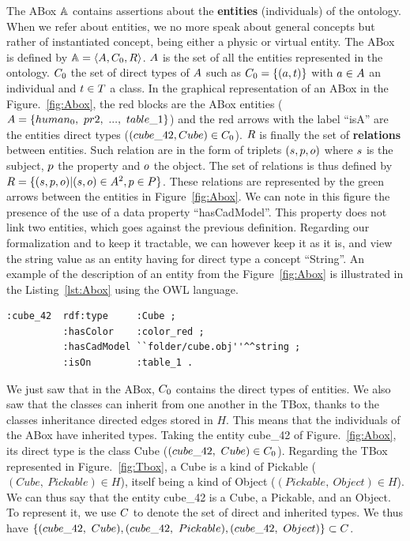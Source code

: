 The ABox $\mathbb{A}$ contains assertions about the \textbf{entities} (individuals) of the ontology. When we refer about entities, we no more speak about general concepts but rather of instantiated concept, being either a physic or virtual entity. The ABox is defined by $\mathbb{A} = \langle A, C_0, R \rangle$. $A$ is the set of all the entities represented in the ontology. $C_0$ the set of direct types of $A$ such as $C_0 = \{(a, t) \}$ with $a \in A$ an individual and $t \in T$ a class. In the graphical representation of an ABox in the Figure.~\ref{fig:Abox}, the red blocks are the ABox entities ($\indivset = \{human_0,\ pr2,\ ...,\ table\_1\}$) and the red arrows with the label ``isA'' are the entities direct types ($(cube\_42, Cube) \in C_0$).
$R$ is finally the set of \textbf{relations} between entities. Such relation are in the form of triplets $(s, p ,o)$ where $s$ is the subject, $p$ the property and $o$ the object. The set of relations is thus defined by $R = \{(s, p ,o) | (s, o) \in A^2, p \in P\}$. These relations are represented by the green arrows between the entities in Figure~\ref{fig:Abox}. We can note in this figure the presence of the use of a data property ``hasCadModel''. This property does not link two entities, which goes against the previous definition. Regarding our formalization and to keep it tractable, we can however keep it as it is, and view the string value as an entity having for direct type a concept ``String''. An example of the description of an entity from the Figure~\ref{fig:Abox} is illustrated in the Listing~\ref{lst:Abox} using the OWL language.

\begin{lstlisting}[frame=single, basicstyle=\scriptsize\ttfamily, label={lst:Abox}, caption={Description of an ontology individual in the OWL language using the Turle syntax.},captionpos=b, style=OwlTurtle_indiv]
:cube_42  rdf:type     :Cube ;
          :hasColor    :color_red ;
          :hasCadModel ``folder/cube.obj''^^string ;
          :isOn        :table_1 .
\end{lstlisting}

We just saw that in the ABox, $C_0$ contains the direct types of entities. We also saw that the classes can inherit from one another in the TBox, thanks to the classes inheritance directed edges stored in $H$. This means that the individuals of the ABox have inherited types. Taking the entity cube\_42 of Figure.~\ref{fig:Abox}, its direct type is the class Cube ($(cube\_42,\ Cube) \in \inheritset_0$). Regarding the TBox represented in Figure.~\ref{fig:Tbox}, a Cube is a kind of Pickable ($(Cube,\ Pickable) \in H$), itself being a kind of Object ($(Pickable,\ Object) \in H$). We can thus say that the entity cube\_42 is a Cube, a Pickable, and an Object. To represent it, we use $C$ to denote the set of direct and inherited types. We thus have $\{ (cube\_42,\ Cube), (cube\_42,\ Pickable), (cube\_42,\ Object)\} \subset \inheritset$.

